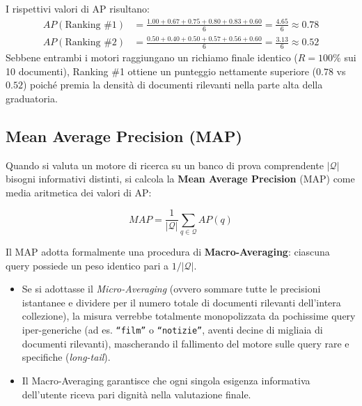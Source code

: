 \begin{example}
I rispettivi valori di AP risultano:
\begin{align*}
AP(\text{Ranking \#1}) &= \frac{1.00 + 0.67 + 0.75 + 0.80 + 0.83 + 0.60}{6} = \frac{4.65}{6} \approx \mathbf{0.78} \\
AP(\text{Ranking \#2}) &= \frac{0.50 + 0.40 + 0.50 + 0.57 + 0.56 + 0.60}{6} = \frac{3.13}{6} \approx \mathbf{0.52}
\end{align*}
Sebbene entrambi i motori raggiungano un richiamo finale identico ($R=100\%$ sui 10 documenti), Ranking \#1 ottiene un punteggio nettamente superiore ($0.78$ vs $0.52$) poiché premia la densità di documenti rilevanti nella parte alta della graduatoria.
\end{example}

\subsection{Mean Average Precision (MAP)}
Quando si valuta un motore di ricerca su un banco di prova comprendente $|\mathcal{Q}|$ bisogni informativi distinti, si calcola la \textbf{Mean Average Precision} (MAP) come media aritmetica dei valori di AP:

\begin{definition}
\begin{equation}
MAP = \frac{1}{|\mathcal{Q}|} \sum_{q \in \mathcal{Q}} AP(q)
\end{equation}
\end{definition}

\begin{property}
Il MAP adotta formalmente una procedura di \textbf{Macro-Averaging}: ciascuna query possiede un peso identico pari a $1/|\mathcal{Q}|$.
\begin{itemize}
    \item Se si adottasse il \textit{Micro-Averaging} (ovvero sommare tutte le precisioni istantanee e dividere per il numero totale di documenti rilevanti dell'intera collezione), la misura verrebbe totalmente monopolizzata da pochissime query iper-generiche (ad es. \texttt{``film''} o \texttt{``notizie''}, aventi decine di migliaia di documenti rilevanti), mascherando il fallimento del motore sulle query rare e specifiche (\textit{long-tail}).
    \item Il Macro-Averaging garantisce che ogni singola esigenza informativa dell'utente riceva pari dignità nella valutazione finale.
\end{itemize}
\end{property}

